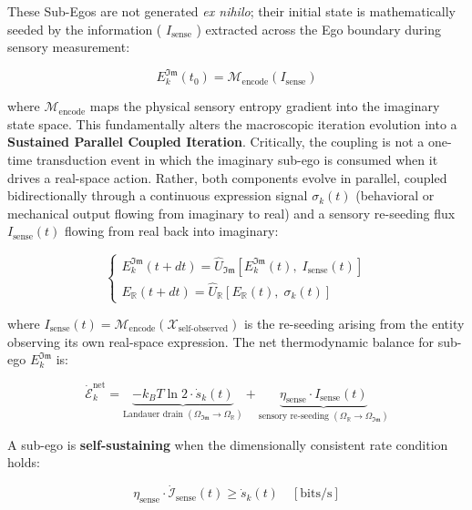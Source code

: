 \documentclass[11pt,a4paper]{article}
\theoremstyle{definition}
\theoremstyle{remark}
\begin{document}
These Sub-Egos are not generated \textit{ex nihilo}; their initial state is mathematically seeded by the information ( $I_{\text{sense}}$ ) extracted across the Ego boundary during sensory measurement:


\begin{equation}
\boxed{E_k^{\mathfrak{Im}}(t_0) = \mathcal{M}_{\text{encode}}(I_{\text{sense}})}
\end{equation}


where $\mathcal{M}_{\text{encode}}$ maps the physical sensory entropy gradient into the imaginary state space.
This fundamentally alters the macroscopic iteration evolution into a \textbf{Sustained Parallel Coupled Iteration}. Critically, the coupling is not a one-time transduction event in which the imaginary sub-ego is consumed when it drives a real-space action. Rather, both components evolve in parallel, coupled bidirectionally through a continuous expression signal $\sigma_k(t)$ (behavioral or mechanical output flowing from imaginary to real) and a sensory re-seeding flux $I_{\text{sense}}(t)$ flowing from real back into imaginary:


\begin{equation}
\boxed{\begin{cases} E_k^{\mathfrak{Im}}(t+dt) = \hat{U}_{\mathfrak{Im}}\!\left[E_k^{\mathfrak{Im}}(t),\; I_{\text{sense}}(t)\right] \\[6pt] E_{\mathbb{R}}(t+dt) = \hat{U}_{\mathbb{R}}\!\left[E_{\mathbb{R}}(t),\; \sigma_k(t)\right] \end{cases}}
\end{equation}


where $I_{\text{sense}}(t) = \mathcal{M}_{\text{encode}}(\mathcal{X}_{\text{self-observed}})$ is the re-seeding arising from the entity observing its own real-space expression. The net thermodynamic balance for sub-ego $E_k^{\mathfrak{Im}}$ is:


\begin{equation}
\boxed{\dot{\mathcal{E}}_{k}^{\text{net}} = \underbrace{-k_B T \ln 2 \cdot \dot{s}_k(t)}_{\text{Landauer drain }(\Omega_{\mathfrak{Im}} \to \Omega_{\mathbb{R}})} + \underbrace{\eta_{\text{sense}} \cdot I_{\text{sense}}(t)}_{\text{sensory re-seeding }(\Omega_{\mathbb{R}} \to \Omega_{\mathfrak{Im}})}}
\end{equation}


A sub-ego is \textbf{self-sustaining} when the dimensionally consistent rate condition holds:


\begin{equation}
\boxed{\eta_{\text{sense}} \cdot \dot{\mathcal{I}}_{\text{sense}}(t) \geq \dot{s}_k(t) \quad [\text{bits/s}]}
\end{equation}
\end{document}
